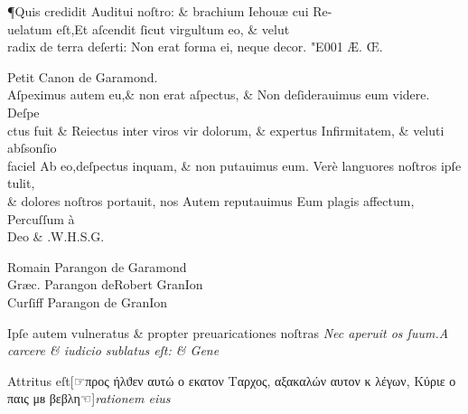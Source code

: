 \documentclass[draft]{article}
\newcommand{\threecolumntypefacenames}[3]{\begin{multicols}{3}
		\tiny
		\hfill \qquad \qquad \qquad \qquad #1\hspace*{\fill}\\
		\columnbreak
		\hfill #2\hspace*{\fill}\\
		\columnbreak
		\hfill #3\qquad \qquad \qquad \qquad \hspace*{\fill}
\end{multicols}}
\begin{document}
\centering
{}
\justifying
\huge
\noindent \P \quad Quis credidit Auditui noſtro: \& brachium Iehou\ae{} cui Re-\\
uelatum eſt,Et aſcendit ſicut virgultum  eo, \& velut\\
radix de terra deſerti: Non erat forma ei, neque decor. \char"E001{} \AE{}. \OE .

\small
\centering
Petit Canon de Garamond.\\
\vspace{-0.5\baselineskip}
\Large
\justifying
Aſpeximus autem eu,\& non erat aſpectus, \& Non deſiderauimus eum videre. Deſpe \\
ctus fuit \& Reiectus inter viros vir dolorum, \& expertus Infirmitatem, \& veluti abſsonſio \\
faciel Ab eo,deſpectus inquam, \& non putauimus eum. Ver\`e languores noſtros ipſe tulit, \\
\& dolores noſtros portauit, nos Autem reputauimus Eum plagis affectum, Percuſſum \`a\\
\centering
Deo \& .\quad  W.\quad H.\quad S.\quad G.\quad \\
\vspace{-\baselineskip}
\threecolumntypefacenames{Romain Parangon de Garamond}{Gr\ae{}c. Parangon deRobert GranIon\quad \quad \quad \quad \quad \quad \quad \quad }{Curſiff Parangon de GranIon}
\vspace*{-\baselineskip}
\scriptsize
\begin{multicols}{2}
	\justifying
	\normalsize
	\justifying
	Ipſe autem vulneratus \& propter preuaricationes noſtras\linebreak
	\columnbreak
	\textit{Nec aperuit os ſuum.A carcere \& iudicio sublatus eſt: \& Gene}
\end{multicols}
\vspace{-1.55\baselineskip}
\normalsize
\justifying
\noindent
Attritus eſt\hfill[\hfill☞\hfill προς  ήλϑεν  αυτώ  ο εκατον Ταρχος,  αξακαλών αυτον κ λέγων, Κύριε ο  παις μᴕ βεβλη\hfill ☜\hfill ]\hfill \textit{rationem eius}
\vspace{-1.05\baselineskip}
\end{document}
